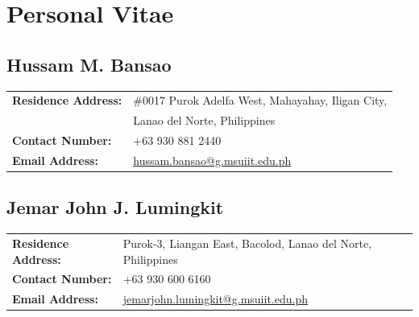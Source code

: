 \chapter{Personal Vitae}
\label{personalVitae}

\section*{Hussam M. Bansao}
\begin{tabular}{@{}ll}
    \textbf{Residence Address:} & \#0017 Purok Adelfa West, Mahayahay, Iligan City, \\
                                & Lanao del Norte, Philippines \\
    \textbf{Contact Number:}    & +63 930 881 2440 \\
    \textbf{Email Address:}     & \href{mailto:hussam.bansao@g.msuiit.edu.ph}{hussam.bansao@g.msuiit.edu.ph} \\
\end{tabular}

\vspace{1.5em}

\section*{Jemar John J. Lumingkit}
\begin{tabular}{@{}ll}
    \textbf{Residence Address:} & Purok-3, Liangan East, Bacolod, Lanao del Norte, Philippines \\
    \textbf{Contact Number:}    & +63 930 600 6160 \\
    \textbf{Email Address:}     & \href{mailto:jemarjohn.lumingkit@g.msuiit.edu.ph}{jemarjohn.lumingkit@g.msuiit.edu.ph} \\
\end{tabular}
